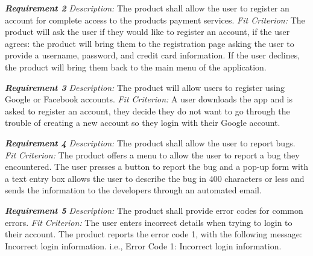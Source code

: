 \documentclass[12pt, titlepage]{article}
\begin{document}
\textbf{\textit{Requirement 2}}\newline
\textit{Description:}\newline
The product shall allow the user to register an account for complete access to the products payment services. \newline\newline
\textit{Fit Criterion:}\newline 
The product will ask the user if they would like to register an account, if the user agrees: the product will bring them to the registration page asking the user to provide a username, password, and credit card information. If the user declines, the product will bring them back to the main menu of the application.
\newline

\textbf{\textit{Requirement 3}}\newline
\textit{Description:}\newline
The product will allow users to register using Google or Facebook accounts. \newline\newline
\textit{Fit Criterion:}\newline 
A user downloads the app and is asked to register an account, they decide they do not want to go through the trouble of creating a new account so they login with their Google account.
\newline

\textbf{\textit{Requirement 4}}\newline
\textit{Description:}\newline
The product shall allow the user to report bugs. \newline\newline
\textit{Fit Criterion:}\newline 
The product offers a menu to allow the user to report a bug they encountered. The user presses a button to report the bug and a pop-up form with a text entry box allows the user to describe the bug in 400 characters or less and sends the information to the developers through an automated email.
\newline

\textbf{\textit{Requirement 5}}\newline
\textit{Description:}\newline
The product shall provide error codes for common errors. \newline\newline
\textit{Fit Criterion:}\newline 
The user enters incorrect details when trying to login to their account. The product reports the error code 1, with the following message: Incorrect login information. i.e., Error Code 1: Incorrect login information.
\newline
\end{document}

